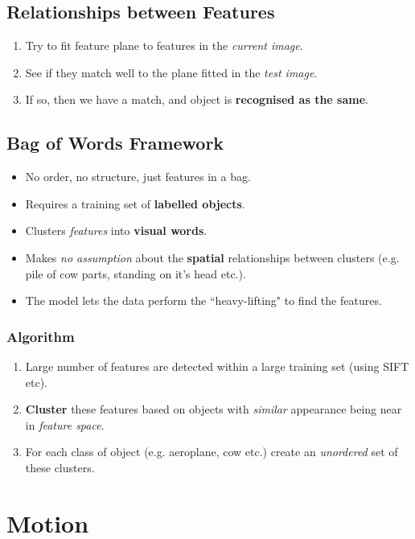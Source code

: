 \documentclass[english, 10pt]{article}
\begin{document}
\subsection{Relationships between Features}

\begin{enumerate}
\item Try to fit feature plane to features in the \textit{current image}.
\item See if they match well to the plane fitted in the \textit{test image}.
\item If so, then we have a match, and object is \textbf{recognised as the same}. 
\end{enumerate}

\subsection{Bag of Words Framework}

\begin{itemize}
\item No order, no structure, just features in a bag. 
\item Requires a training set of \textbf{labelled objects}.
\item Clusters \textit{features} into \textbf{visual words}.
\item Makes \textit{no assumption} about the \textbf{spatial} relationships between clusters (e.g. pile of cow parts, standing on it's head etc.).
\item The model lets the data perform the ``heavy-lifting" to find the features. 
\end{itemize}

\subsubsection{Algorithm}

\begin{enumerate}
\item Large number of features are detected within a large training set (using SIFT etc).
\item \textbf{Cluster} these features based on objects with \textit{similar} appearance being near in \textit{feature space}.
\item For each class of object (e.g. aeroplane, cow etc.) create an \textit{unordered} set of these clusters.
\end{enumerate}


\section{Motion}\label{motion}
\end{document}
